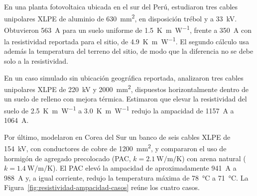 En una planta fotovoltaica ubicada en el sur del Perú, \textcite[7--8]{ariasVelasquez2023} estudiaron tres cables unipolares XLPE de aluminio de \SI{630}{\milli\metre\squared}, en disposición trébol y a \SI{33}{\kilo\volt}. Obtuvieron \SI{563}{\ampere} para un suelo uniforme de \SI{1.5}{\kelvin\metre\per\watt}, frente a \SI{350}{\ampere} con la resistividad reportada para el sitio, de \SI{4.9}{\kelvin\metre\per\watt}. El segundo cálculo usa además la temperatura del terreno del sitio, de modo que la diferencia no se debe solo a la resistividad.

En un caso simulado sin ubicación geográfica reportada, \textcite[15--16]{atoccsa2024} analizaron tres cables unipolares XLPE de \SI{220}{\kilo\volt} y \SI{2000}{\milli\metre\squared}, dispuestos horizontalmente dentro de un suelo de relleno con mejora térmica. Estimaron que elevar la resistividad del suelo de \SI{2.5}{\kelvin\metre\per\watt} a \SI{3.0}{\kelvin\metre\per\watt} redujo la ampacidad de \SI{1157}{\ampere} a \SI{1064}{\ampere}.

Por último, \textcite[12--16]{kim2025} modelaron en Corea del Sur un banco de seis cables XLPE de \SI{154}{\kilo\volt}, con conductores de cobre de \SI{1200}{\milli\metre\squared}, y compararon el uso de hormigón de agregado precolocado (PAC, $k=\SI{2.1}{\watt\per\metre\per\kelvin}$) con arena natural ($k=\SI{1.4}{\watt\per\metre\per\kelvin}$). El PAC elevó la ampacidad de aproximadamente \SI{941}{\ampere} a \SI{988}{\ampere} y, a igual corriente, redujo la temperatura máxima de \SI{78}{\celsius} a \SI{71}{\celsius}. La Figura~\ref{fig:resistividad-ampacidad-casos} reúne los cuatro casos.


